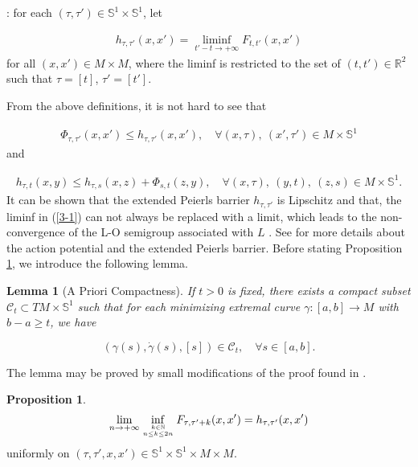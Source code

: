 \documentclass{amsart}[12pt]
\newtheorem{lemma}[theorem]{Lemma}
\theoremstyle{definition}
\newtheorem{proposition}[theorem]{Proposition}
\theoremstyle{remark}
\numberwithin{equation}{section}
\begin{document}
\vskip0.1cm

: for each
$(\tau,\tau')\in\mathbb{S}^1\times\mathbb{S}^1$, let

\begin{align}\label{3-1}
 h_{\tau,\tau'}(x,x')=\liminf_{t'-t\to+\infty}F_{t,t'}(x,x')
\end{align}
for all $(x,x')\in M\times M$, where the liminf is restricted to
the set of $(t,t')\in\mathbb{R}^2$ such that $\tau=[t]$,
$\tau'=[t']$.

\vskip0.1cm

From the above definitions, it is not hard to see that

\begin{align}\label{3-2}
\Phi_{\tau,\tau'}(x,x')\leq h_{\tau,\tau'}(x,x'), \quad \forall
(x,\tau),\ (x',\tau')\in M\times\mathbb{S}^1
\end{align}
and

\begin{align}\label{3-3}
h_{\tau,t}(x,y)\leq h_{\tau,s}(x,z)+\Phi_{s,t}(z,y), \quad \forall
(x,\tau),\ (y,t),\ (z,s)\in M\times\mathbb{S}^1.
\end{align}
It can be shown that the extended Peierls barrier $h_{\tau,\tau'}$
is Lipschitz and that, the liminf in (\ref{3-1}) can not always be
replaced with a limit, which leads to the non-convergence of the
L-O semigroup associated with $L$ \cite{Fat5}. See \cite{Sor-b}
for more details about the action potential and the extended
Peierls barrier. Before stating Proposition \ref{pr3-4}, we
introduce the following lemma.

\begin{lemma}[A Priori Compactness]\label{le3-1}
If $t>0$ is fixed, there exists a compact subset
$\mathcal{C}_t\subset TM\times\mathbb{S}^1$ such that for each
minimizing extremal curve $\gamma:[a,b]\to M$ with $b-a\geq t$, we
have

\[
(\gamma(s),\dot{\gamma}(s),[s])\in \mathcal{C}_t, \quad \forall
s\in[a,b].
\]
\end{lemma}

The lemma may be proved by small modifications of the proof found
in \cite[Corollary 4.3.2]{Fat-b}.

\begin{proposition}\label{pr3-4}
\[
\lim_{n\to+\infty}\inf_{k\in\mathbb{N} \atop n\leq k\leq
2n}F_{\tau,\tau'+k}(x,x')=h_{\tau,\tau'}(x,x')
\]
uniformly on  $(\tau,\tau',x,x')\in
\mathbb{S}^1\times\mathbb{S}^1\times M\times M$.
\end{proposition}
\end{document}

